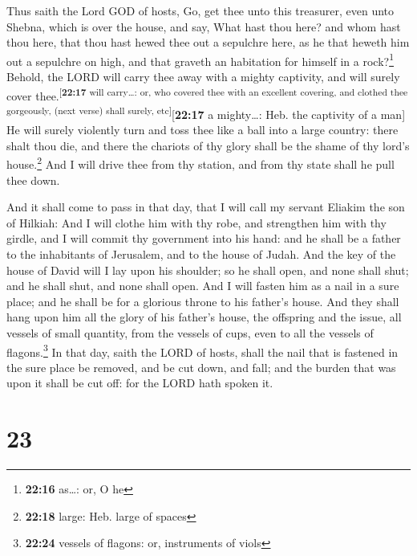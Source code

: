  Thus saith the Lord GOD of hosts, Go, get thee unto this
treasurer, even unto Shebna, which is over the house, and say,
 What hast thou here? and whom hast thou here, that thou
hast hewed thee out a sepulchre here, as he that heweth him out a
sepulchre on high, and that graveth an habitation for himself in a
rock?\footnote{\textbf{22:16} as\ldots: or, O he} 
Behold, the LORD will carry thee away with a mighty captivity, and will
surely cover thee.\textsuperscript{{[}\textbf{22:17} will carry\ldots:
or, who covered thee with an excellent covering, and clothed thee
gorgeously, (next verse) shall surely, etc{]}}{[}\textbf{22:17} a
mighty\ldots: Heb. the captivity of a man{]}  He will
surely violently turn and toss thee like a ball into a large country:
there shalt thou die, and there the chariots of thy glory shall be the
shame of thy lord's house.\footnote{\textbf{22:18} large: Heb. large of
  spaces}  And I will drive thee from thy station, and
from thy state shall he pull thee down.

 And it shall come to pass in that day, that I will call
my servant Eliakim the son of Hilkiah:  And I will clothe
him with thy robe, and strengthen him with thy girdle, and I will commit
thy government into his hand: and he shall be a father to the
inhabitants of Jerusalem, and to the house of Judah.  And
the key of the house of David will I lay upon his shoulder; so he shall
open, and none shall shut; and he shall shut, and none shall open.
 And I will fasten him as a nail in a sure place; and he
shall be for a glorious throne to his father's house. 
And they shall hang upon him all the glory of his father's house, the
offspring and the issue, all vessels of small quantity, from the vessels
of cups, even to all the vessels of flagons.\footnote{\textbf{22:24}
  vessels of flagons: or, instruments of viols}  In that
day, saith the LORD of hosts, shall the nail that is fastened in the
sure place be removed, and be cut down, and fall; and the burden that
was upon it shall be cut off: for the LORD hath spoken it.

\hypertarget{section-22}{%
\section{23}\label{section-22}}


